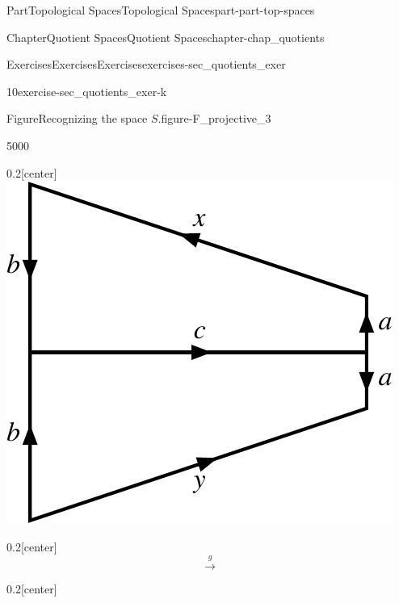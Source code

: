 \documentclass[oneside,10pt,]{book}
\numberwithin{equation}{chapter}
\begin{document}
\begin{partptx}{Part}{Topological Spaces}{}{Topological Spaces}{}{}{part-part-top-spaces}
\begin{chapterptx}{Chapter}{Quotient Spaces}{}{Quotient Spaces}{}{}{chapter-chap_quotients}
\begin{exercises-section}{Exercises}{Exercises}{}{Exercises}{}{}{exercises-sec_quotients_exer}
\begin{divisionexercise}{10}{}{}{exercise-sec_quotients_exer-k}
\begin{enumerate}[font=\bfseries,label=(\alph*),ref=\alph*]
\begin{enumerate}[font=\bfseries,label=(\roman*),ref=\theenumi.\roman*]
\begin{figureptx}{Figure}{Recognizing the space \(S\).}{figure-F_projective_3}{}
\begin{sidebyside}{5}{0}{0}{0}
\begin{sbspanel}{0.2}[center]
\includegraphics[width=\linewidth]{external/Projective_Disk_hom_1.pdf}
\end{sbspanel}%
\begin{sbspanel}{0.2}[center]%
%
\begin{equation*}
\xrightarrow{g}
\end{equation*}
%
\end{sbspanel}%
\begin{sbspanel}{0.2}[center]%

\end{sbspanel}
\end{sidebyside}
\end{figureptx}
\end{enumerate}
\end{enumerate}
\end{divisionexercise}
\end{exercises-section}
\end{chapterptx}
\end{partptx}
\end{document}
